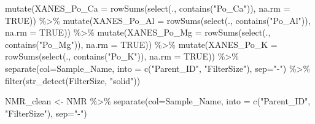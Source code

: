 \documentclass[
]{article}
\newenvironment{Shaded}{\begin{snugshade}}{\end{snugshade}}
\newcommand{\AttributeTok}[1]{\textcolor[rgb]{0.77,0.63,0.00}{#1}}
\newcommand{\ConstantTok}[1]{\textcolor[rgb]{0.00,0.00,0.00}{#1}}
\newcommand{\FunctionTok}[1]{\textcolor[rgb]{0.00,0.00,0.00}{#1}}
\newcommand{\NormalTok}[1]{#1}
\newcommand{\OtherTok}[1]{\textcolor[rgb]{0.56,0.35,0.01}{#1}}
\newcommand{\SpecialCharTok}[1]{\textcolor[rgb]{0.00,0.00,0.00}{#1}}
\newcommand{\StringTok}[1]{\textcolor[rgb]{0.31,0.60,0.02}{#1}}
\begin{document}
\begin{Shaded}
\begin{Highlighting}[]
  \FunctionTok{mutate}\NormalTok{(}\AttributeTok{XANES\_Po\_Ca =} \FunctionTok{rowSums}\NormalTok{(}\FunctionTok{select}\NormalTok{(., }\FunctionTok{contains}\NormalTok{(}\StringTok{"Po\_Ca"}\NormalTok{)), }\AttributeTok{na.rm =} \ConstantTok{TRUE}\NormalTok{)) }\SpecialCharTok{\%\textgreater{}\%}
  \FunctionTok{mutate}\NormalTok{(}\AttributeTok{XANES\_Po\_Al =} \FunctionTok{rowSums}\NormalTok{(}\FunctionTok{select}\NormalTok{(., }\FunctionTok{contains}\NormalTok{(}\StringTok{"Po\_Al"}\NormalTok{)), }\AttributeTok{na.rm =} \ConstantTok{TRUE}\NormalTok{)) }\SpecialCharTok{\%\textgreater{}\%}
  \FunctionTok{mutate}\NormalTok{(}\AttributeTok{XANES\_Po\_Mg =} \FunctionTok{rowSums}\NormalTok{(}\FunctionTok{select}\NormalTok{(., }\FunctionTok{contains}\NormalTok{(}\StringTok{"Po\_Mg"}\NormalTok{)), }\AttributeTok{na.rm =} \ConstantTok{TRUE}\NormalTok{)) }\SpecialCharTok{\%\textgreater{}\%}
  \FunctionTok{mutate}\NormalTok{(}\AttributeTok{XANES\_Po\_K =} \FunctionTok{rowSums}\NormalTok{(}\FunctionTok{select}\NormalTok{(., }\FunctionTok{contains}\NormalTok{(}\StringTok{"Po\_K"}\NormalTok{)), }\AttributeTok{na.rm =} \ConstantTok{TRUE}\NormalTok{)) }\SpecialCharTok{\%\textgreater{}\%}
  \FunctionTok{separate}\NormalTok{(}\AttributeTok{col=}\NormalTok{Sample\_Name, }\AttributeTok{into =} \FunctionTok{c}\NormalTok{(}\StringTok{"Parent\_ID"}\NormalTok{, }\StringTok{"FilterSize"}\NormalTok{), }\AttributeTok{sep=}\StringTok{"{-}"}\NormalTok{) }\SpecialCharTok{\%\textgreater{}\%}
  \FunctionTok{filter}\NormalTok{(}\FunctionTok{str\_detect}\NormalTok{(FilterSize, }\StringTok{"solid"}\NormalTok{))}

\NormalTok{NMR\_clean }\OtherTok{\textless{}{-}}\NormalTok{ NMR }\SpecialCharTok{\%\textgreater{}\%}
  \FunctionTok{separate}\NormalTok{(}\AttributeTok{col=}\NormalTok{Sample\_Name, }\AttributeTok{into =} \FunctionTok{c}\NormalTok{(}\StringTok{"Parent\_ID"}\NormalTok{, }\StringTok{"FilterSize"}\NormalTok{), }\AttributeTok{sep=}\StringTok{"{-}"}\NormalTok{) }
\end{Highlighting}
\end{Shaded}
\end{document}
